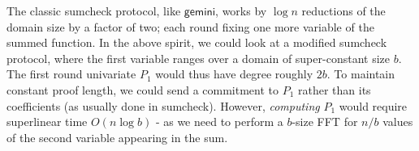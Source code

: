 \documentclass[11pt]{article} %
\newcommand{\gemini}{\ensuremath{\mathsf{gemini}}\xspace}
\newcommand{\eq}{\ensuremath{\mathsf{eq}}\xspace}
\renewcommand{\eq}{\ensuremath{\mathbf{eq}}\xspace}
\newcommand{\mle}[1]{\ensuremath{\hat{#1}}\xspace}
\begin{document}
The classic sumcheck protocol, like \gemini, works by $\log n$ reductions of the domain size by a factor of two; each round fixing one more variable of the summed function. In the above spirit, we could look at a modified sumcheck protocol, where the first variable ranges over a domain of super-constant size $b$. The first round univariate $P_1$ would thus have degree roughly $2b$. 
To maintain constant proof length, we could send a commitment to $P_1$ rather than its coefficients (as usually done in sumcheck).
However, \emph{computing} $P_1$ would require superlinear time  $O(n \log b)$ - as we need to perform a $b$-size FFT for $n/b$ values of the second variable appearing in the sum. 


% 
% 
% 
% 
% 
% 
% 
% 
% 
% 
% 
% 
% 
\end{document}
